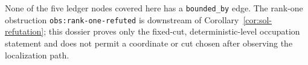 \documentclass[../main.tex]{subfiles}
\begin{document}
None of the five ledger nodes covered here has a \texttt{bounded\_by} edge.  The rank-one
obstruction \texttt{obs:rank-one-refuted} is downstream of
Corollary~\ref{cor:sol-refutation}; this dossier proves only the fixed-cut, deterministic-level
occupation statement and does not permit a coordinate or cut chosen after observing the
localization path.
\end{document}
